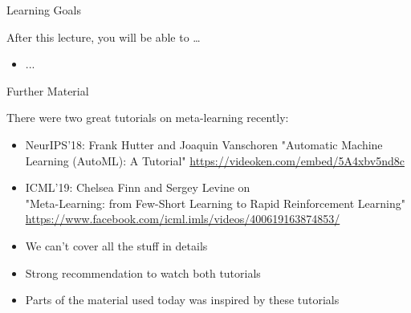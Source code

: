 \begin{frame}[c]{Learning Goals}

After this lecture, you will be able to \ldots

\begin{itemize}
	\item ...
\end{itemize}

\end{frame}
\begin{frame}[c]{Further Material}

There were two great tutorials on meta-learning recently:

\begin{itemize}
	\item NeurIPS'18: Frank Hutter and Joaquin Vanschoren
	"Automatic Machine Learning (AutoML): A Tutorial"
	\url{https://videoken.com/embed/5A4xbv5nd8c}
	\item ICML'19: Chelsea Finn and Sergey Levine on\\
	"Meta-Learning: from Few-Short Learning to Rapid Reinforcement Learning"\\
	\url{https://www.facebook.com/icml.imls/videos/400619163874853/}
\end{itemize}

\begin{itemize}
	\item We can't cover all the stuff in details
	\item Strong recommendation to watch both tutorials
	\item Parts of the material used today was inspired by these tutorials
\end{itemize}


\end{frame}
